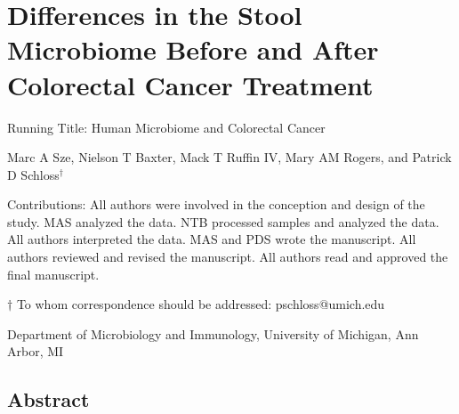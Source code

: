 \documentclass[12pt,]{article}
\title{}
\author{}
\date{}
\begin{document}
\section{Differences in the Stool Microbiome Before and After Colorectal
Cancer
Treatment}\label{differences-in-the-stool-microbiome-before-and-after-colorectal-cancer-treatment}

\vspace{25mm}

\begin{center}
Running Title: Human Microbiome and Colorectal Cancer


\vspace{10mm}

Marc A Sze, Nielson T Baxter, Mack T Ruffin IV, Mary AM Rogers, and Patrick D Schloss${^\dagger}$

\vspace{10mm}

Contributions: All authors were involved in the conception and design of the study. MAS analyzed the data. NTB processed samples and analyzed the data. All authors interpreted the data. MAS and PDS wrote the manuscript. All authors reviewed and revised the manuscript. All authors read and approved the final manuscript.

\vspace{20mm}

$\dagger$ To whom correspondence should be addressed: pschloss@umich.edu

Department of Microbiology and Immunology, University of Michigan, Ann Arbor, MI
\end{center}

\newpage

\linenumbers

\subsection{Abstract}\label{abstract}
\end{document}
